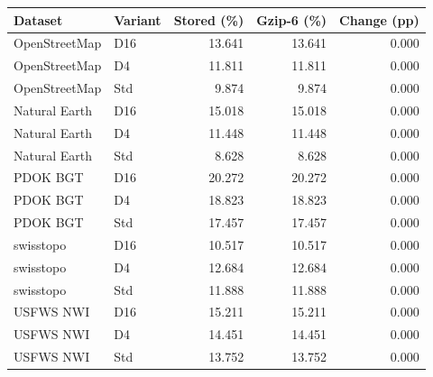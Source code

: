 \begingroup\small\setlength{\tabcolsep}{3pt}
\begin{longtable}{llrrr}
\toprule
Dataset & Variant & Stored (\%) & Gzip-6 (\%) & Change (pp) \\
\midrule
OpenStreetMap & D16 & 13.641 & 13.641 & 0.000 \\
OpenStreetMap & D4 & 11.811 & 11.811 & 0.000 \\
OpenStreetMap & Std & 9.874 & 9.874 & 0.000 \\
Natural Earth & D16 & 15.018 & 15.018 & 0.000 \\
Natural Earth & D4 & 11.448 & 11.448 & 0.000 \\
Natural Earth & Std & 8.628 & 8.628 & 0.000 \\
PDOK BGT & D16 & 20.272 & 20.272 & 0.000 \\
PDOK BGT & D4 & 18.823 & 18.823 & 0.000 \\
PDOK BGT & Std & 17.457 & 17.457 & 0.000 \\
swisstopo & D16 & 10.517 & 10.517 & 0.000 \\
swisstopo & D4 & 12.684 & 12.684 & 0.000 \\
swisstopo & Std & 11.888 & 11.888 & 0.000 \\
USFWS NWI & D16 & 15.211 & 15.211 & 0.000 \\
USFWS NWI & D4 & 14.451 & 14.451 & 0.000 \\
USFWS NWI & Std & 13.752 & 13.752 & 0.000 \\
\bottomrule
\end{longtable}
\endgroup
